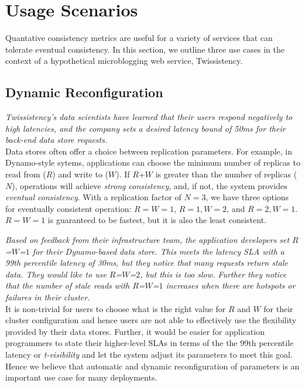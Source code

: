 \section{Usage Scenarios}
\label{sec:scenarios}

Quantative consistency metrics are useful for a variety of services
that can tolerate eventual consistency. In this section, we outline
three use cases in the context of a hypothetical microblogging web
service, Twissistency.

\subsection{Dynamic Reconfiguration}

\textit{Twissistency's data scientists have learned that their users
  respond negatively to high latencies, and the company sets a desired
  latency bound of 50ms for their back-end data store requests.}\\

Data stores often offer a choice between replication parameters. For
example, in Dynamo-style sytems, applications can choose the minimum
number of replicas to read from ($R$) and write to ($W$). If $R$+$W$
is greater than the number of replicas ($N$), operations will achieve
\textit{strong consistency}, and, if not, the system provides 
\textit{eventual consistency}. With a replication factor of $N=3$, we 
have three options for eventually consistent operation: 
$R$$=$$W$$=$$1$, $R$$=$$1$$, W$$=$$2$, and $R$$=$$2$$, W$$=$$1$. 
$R$$=$$W$$=$$1$ is guaranteed to be fastest, but it is also the least 
consistent.

\textit{Based on feedback from their infrastructure team, the
  application developers set $R$=$W$=$1$ for their Dynamo-based data
  store. This meets the latency SLA with a 99th percentile latency of 30ms,
  but they notice that many requests return stale data. They would
  like to use $R$=$W$=$2$, but this is too slow. Further they notice that the
  number of stale reads with $R$=$W$=$1$ increases when there are hotspots 
  or failures in their cluster.}\\

It is non-trivial for users to choose what is the right value for $R$ and $W$
for their cluster configuration and hence users are not able to effectively use
the flexibility provided by their data stores. Further, it would be easier for
application programmers to state their higher-level SLAs in terms of the the 
99th percentile latency or \textit{t-visibility} and let the system adjust its 
parameters to meet this goal. Hence we believe that automatic and dynamic 
reconfiguration of parameters is an important use case for many deployments. 

